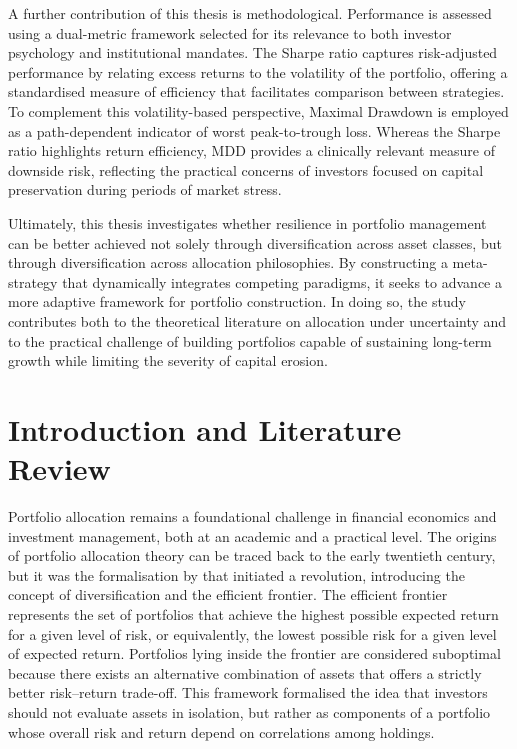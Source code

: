 \documentclass[12pt,a4paper]{report}
\begin{document}
A further contribution of this thesis is methodological. Performance is assessed using a dual-metric framework selected for its relevance to both investor psychology and institutional mandates. The Sharpe ratio \citep{Sharpe1966, Sharpe1994} captures risk-adjusted performance by relating excess returns to the volatility of the portfolio, offering a standardised measure of efficiency that facilitates comparison between strategies. To complement this volatility-based perspective, Maximal Drawdown \citep{MagdonIsmail2004} is employed as a path-dependent indicator of worst peak-to-trough loss. Whereas the Sharpe ratio highlights return efficiency, MDD provides a clinically relevant measure of downside risk, reflecting the practical concerns of investors focused on capital preservation during periods of market stress.

Ultimately, this thesis investigates whether resilience in portfolio management can be better achieved not solely through diversification across asset classes, but through diversification across allocation philosophies. By constructing a meta-strategy that dynamically integrates competing paradigms, it seeks to advance a more adaptive framework for portfolio construction. In doing so, the study contributes both to the theoretical literature on allocation under uncertainty and to the practical challenge of building portfolios capable of sustaining long-term growth while limiting the severity of capital erosion.

\chapter{Introduction and Literature Review}

Portfolio allocation remains a foundational challenge in financial economics and investment management, both at an academic and a practical level. The origins of portfolio allocation theory can be traced back to the early twentieth century, but it was the formalisation by \citet{Markowitz1952} that initiated a revolution, introducing the concept of diversification and the efficient frontier. The efficient frontier represents the set of portfolios that achieve the highest possible expected return for a given level of risk, or equivalently, the lowest possible risk for a given level of expected return. Portfolios lying inside the frontier are considered suboptimal because there exists an alternative combination of assets that offers a strictly better risk–return trade-off. This framework formalised the idea that investors should not evaluate assets in isolation, but rather as components of a portfolio whose overall risk and return depend on correlations among holdings.
\end{document}
